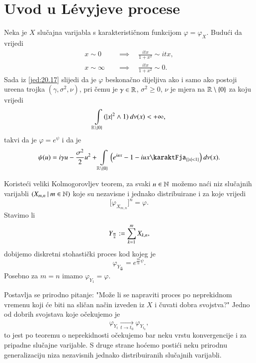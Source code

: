 
\chapter{Uvod u L\' evyjeve procese}

Neka je $X$ slu\v cajna varijabla s karakteristi\v cnom funkcijom $\varphi = \varphi_X$.
Budu\' ci da vrijedi
\begin{equation*}
    \begin{aligned}
        x \sim 0 \quad &\implies \quad \frac{i t x}{1 + x^2} \sim i t x,\\
        x \sim \infty \quad &\implies \quad \frac{i t x}{1 + x^2} \sim 0.
    \end{aligned}
\end{equation*}
Sada iz \eqref{jed:20.17} slijedi da je $\varphi$ beskona\v cno dijeljiva ako i samo ako postoji ure\dj ena trojka $(\gamma, \sigma^2, \nu)$, pri \v cemu je $\gamma \in \mathbb{R}$, $\sigma^2 \geq 0$, $\nu$ je mjera na $\mathbb{R} \setminus \{0\}$ za koju vrijedi
\begin{equation*}
    \int\limits_{\mathbb{R} \setminus \{0\}} (|x|^2 \land 1) \: d \nu (x) < +\infty,
\end{equation*}
takvi da je $\varphi = e^\psi$ i da je
\begin{equation}    \label{jed:21.1}
    \psi (u) = i \gamma u - \frac{\sigma^2}{2} u^2 + \int\limits_{\real \setminus \{0\}} \Big( e^{i u x }- 1 - i u x \karaktFja_{\{|x| < 1\}} \Big) \: d \nu (x).
\end{equation}

Koriste\' ci veliki Kolmogorovljev teorem, za svaki $n \in \mathbb{N}$ mo\v zemo na\' ci niz slu\v cajnih varijabli $({X_{m, n}} \: | \: {m \in \mathbb{N}})$ koje su nezavisne i jednako distribuirane i za koje vrijedi
\begin{equation*}
    \big[ \varphi_{X_{m, n}} \big]^n = \varphi.
\end{equation*}
Stavimo li
\begin{equation*}
    Y_{\frac{m}{n}} := \sum\limits_{k = 1}^{m} X_{k, n},
\end{equation*}
dobijemo diskretni stohasti\v cki proces kod kojeg je
\begin{equation*}
    \varphi_{Y_{\frac{m}{n}}} = e^{\frac{m}{n} \psi}.
\end{equation*}
Posebno za $m = n$ imamo $\varphi_{Y_1} = \varphi$.

Postavlja se prirodno pitanje: "Mo\v ze li se napraviti proces po neprekidnom vremenu koji \' ce biti na sli\v can na\v cin  izveden iz $X$ i \v cuvati dobra svojstva?"
Jedno od dobrih svojstava koje o\v cekujemo je
\begin{equation*}
    \varphi_{Y_t} \xrightarrow[t \to t_0]{} \varphi_{Y_{t_0}},
\end{equation*}
to jest po teoremu o neprekidnosti o\v cekujemo bar neku vrstu konvergencije i za pripadne slu\v cajne varijable.
S druge strane ho\' cemo posti\' ci neku prirodnu generalizaciju niza nezavisnih jednako distribuiranih slu\v cajnih varijabli.

